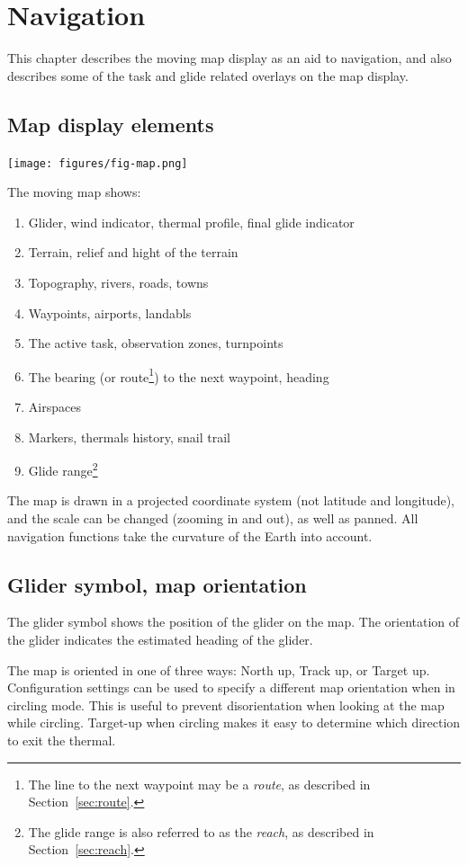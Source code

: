 \chapter{Navigation}\label{cha:navigation}
This chapter describes the moving map display as an aid to navigation,
and also describes some of the task and glide related overlays on the
map display.

\section{Map display elements}

\begin{maxipage}
\texttt{[image: figures/fig-map.png]}
\end{maxipage}

The moving map shows:
\begin{enumerate}
\item Glider, wind indicator, thermal profile, final glide indicator
\item Terrain, relief and hight of the terrain
\item Topography, rivers, roads, towns
\item Waypoints, airports, landabls
\item The active task, observation zones, turnpoints
\item The bearing (or route\footnote{The line to the next waypoint may be a
  {\em route}, as described in Section~\ref{sec:route}.}) to the next waypoint,
  heading
\item Airspaces
\item Markers, thermals history, snail trail
\item Glide range\footnote{The glide range is also referred to as the
  {\em reach}, as described in Section~\ref{sec:reach}.}
\end{enumerate}
The map is drawn in a projected coordinate system (not latitude and
longitude), and the scale can be changed (zooming in and out), as well
as panned.  All navigation functions take the curvature of the Earth
into account.

\section{Glider symbol, map orientation}
The glider symbol shows the position of the glider on the map.  The
orientation of the glider indicates the estimated heading of the
glider.

The map is oriented in one of three ways: North up,
Track up, or Target up.  Configuration settings  can be used
to specify a different map orientation when in circling mode. This is useful to prevent
disorientation when looking at the map while circling.  Target-up when
circling makes it easy to determine which direction to exit the
thermal.

